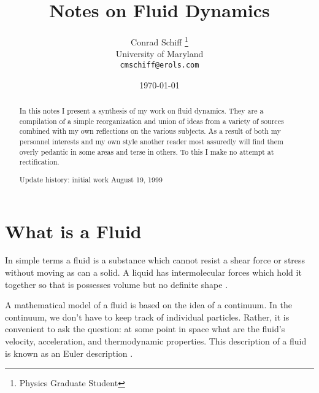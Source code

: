 
\def\.{{\quad .}}  
\def\_,{{\quad ,}} 



%
%
\title{Notes on Fluid Dynamics}
\author{Conrad Schiff \thanks{Physics Graduate Student} \\
        University of Maryland\\
	  \texttt{cmschiff@erols.com}}
\date{\today}
\maketitle


%
%
\begin{abstract}
In this notes I present a synthesis of my work on fluid dynamics.  They are a 
compilation of a simple reorganization and union of ideas from a variety of 
sources combined with my own reflections on the various subjects.  As a result
of both my personnel interests and my own style another reader most assuredly will
find them overly pedantic in some areas and terse in others.  To this I make
no attempt at rectification.

Update history: initial work August 19, 1999
\end{abstract}

\section{What is a Fluid}\label{S:fluid_def}
In simple terms a fluid is a substance which cannot resist 
a shear force or stress without moving as can a solid.  A liquid
has intermolecular forces which hold it together so that is possesses
volume but no definite shape \cite{hughes}.

A mathematical model of a fluid is based on the idea of a continuum.
In the continuum, we don't have to keep track of individual particles.
Rather, it is convenient to ask the question: at some point in space what
are the fluid's velocity, acceleration, and thermodynamic properties.
This description of a fluid is known as an Euler description \cite{hughes}.

